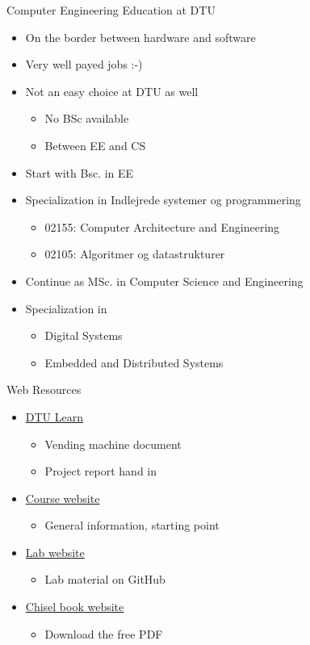 \begin{frame}[fragile]{Computer Engineering Education at DTU}
\begin{itemize}
\item On the border between hardware and software
\item Very well payed jobs :-)
\item Not an easy choice at DTU as well
\begin{itemize}
\item No BSc available
\item Between EE and CS
\end{itemize}
\item Start with Bsc. in EE
\item Specialization in Indlejrede systemer og programmering
\begin{itemize}
\item 02155: Computer Architecture and Engineering
\item 02105: Algoritmer og datastrukturer
\end{itemize}
\item Continue as MSc. in Computer Science and Engineering
\item Specialization in
\begin{itemize}
\item Digital Systems
\item Embedded and Distributed Systems
\end{itemize}
\end{itemize}
\end{frame}

\begin{frame}[fragile]{Web Resources}
\begin{itemize}
\item \href{https://learn.inside.dtu.dk/d2l/home}{DTU Learn}
\begin{itemize}
\item Vending machine document
\item Project report hand in
\end{itemize}
\item \href{http://www2.imm.dtu.dk/courses/02139/}{Course website}
\begin{itemize}
\item General information, starting point
\end{itemize}
\item \href{https://github.com/schoeberl/chisel-lab}{Lab website}
\begin{itemize}
\item Lab material on GitHub
\end{itemize}
\item \href{http://www.imm.dtu.dk/~masca/chisel-book.html}{Chisel book website}
\begin{itemize}
\item Download the free PDF
\end{itemize}
\end{itemize}
\end{frame}

